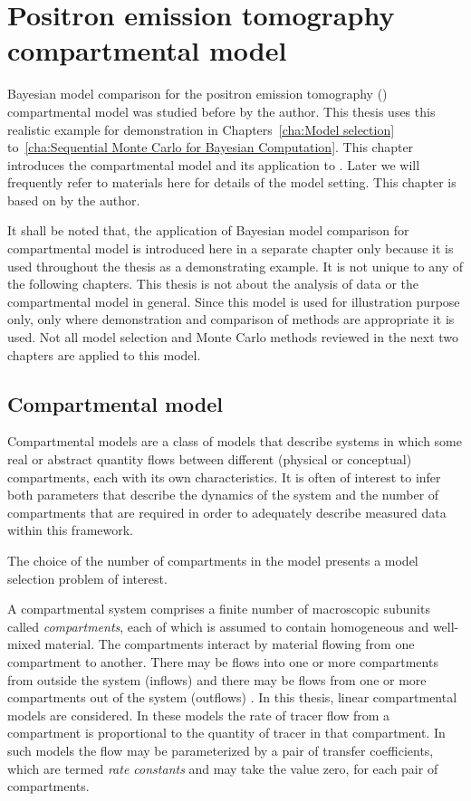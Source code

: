\chapter{Positron emission tomography compartmental model}
\label{cha:Positron emission tomography compartmental model}

Bayesian model comparison for the positron emission tomography (\pet) compartmental model was studied before by the author. This thesis uses this realistic example for demonstration in Chapters~\ref{cha:Model selection} to~\ref{cha:Sequential Monte Carlo for Bayesian Computation}. This chapter introduces the compartmental model and its application to \pet. Later we will frequently refer to materials here for details of the model setting. This chapter is based on \cite{Zhou2013} by the author.

\begin{draftpar}
It shall be noted that, the application of Bayesian model comparison for \pet compartmental model is introduced here in a separate chapter only because it is used throughout the thesis as a demonstrating example. It is not unique to any of the following chapters. This thesis is not about the analysis of \pet data or the compartmental model in general. Since this model is used for illustration purpose only, only where demonstration and comparison of methods are appropriate it is used. Not all model selection and Monte Carlo methods reviewed in the next two chapters are applied to this model.
\end{draftpar}

\section{Compartmental model}
\label{sec:Compartmental model}

Compartmental models are a class of models that describe systems in which some real or abstract quantity flows between different (physical or conceptual) compartments, each with its own characteristics. It is often of interest to infer both parameters that describe the dynamics of the system and the number of compartments that are required in order to adequately describe measured data within this framework.
\begin{draftpar}
The choice of the number of compartments in the model presents a model selection problem of interest.
\end{draftpar}

A compartmental system comprises a finite number of macroscopic subunits called \emph{compartments}, each of which is assumed to contain homogeneous and well-mixed material. The compartments interact by material flowing from one compartment to another. There may be flows into one or more compartments from outside the system (inflows) and there may be flows from one or more compartments out of the system (outflows) \cite{Jacquez:1996gc}. In this thesis, linear compartmental models are considered. In these models the rate of tracer flow from a compartment is proportional to the quantity of tracer in that compartment. In such models the flow may be parameterized by a pair of transfer coefficients, which are termed \emph{rate constants} and may take the value zero, for each pair of compartments.


